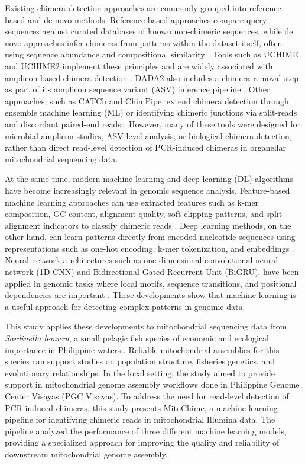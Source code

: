 Existing chimera detection approaches are commonly grouped into reference-based and de novo methods. Reference-based approaches compare query sequences against curated databases of known non-chimeric sequences, while de novo approaches infer chimeras from patterns within the dataset itself, often using sequence abundance and compositional similarity \citep{Edgar2011,Edgar2016}. Tools such as UCHIME and UCHIME2 implement these principles and are widely associated with amplicon-based chimera detection \citep{Edgar2011,Edgar2016}. DADA2 also includes a chimera removal step as part of its amplicon sequence variant (ASV) inference pipeline \citep{Callahan2016}. Other approaches, such as CATCh and ChimPipe, extend chimera detection through ensemble machine learning (ML) or identifying chimeric junctions via split-reads and discordant paired-end reads \citep{Mysara2015,Rodriguez2017}. However, many of these tools were designed for microbial amplicon studies, ASV-level analysis, or biological chimera detection, rather than direct read-level detection of PCR-induced chimeras in organellar mitochondrial sequencing data.

At the same time, modern machine learning and deep learning (DL) algorithms have become increasingly relevant in genomic sequence analysis. Feature-based machine learning approaches can use extracted features such as k-mer composition, GC content, alignment quality, soft-clipping patterns, and split-alignment indicators to classify chimeric reads \citep{Vervier2015,Li2018,Sedlazeck2018,Ren2020}. Deep learning methods, on the other hand, can learn patterns directly from encoded nucleotide sequences using representations such as one-hot encoding, k-mer tokenization, and embeddings \citep{He2021}. Neural network a  rchitectures such as one-dimensional convolutional neural network (1D CNN) and Bidirectional Gated Recurrent Unit (BiGRU), have been applied in genomic tasks where local motifs, sequence transitions, and positional dependencies are important \citep{Alipanahi2015,Shen2018,FernandezCastillo2022,Tabane2025}. These developments show that machine learning is a useful approach for detecting complex patterns in genomic data.

This study applies these developments to mitochondrial sequencing data from \textit{Sardinella lemuru}, a small pelagic fish species of economic and ecological importance in Philippine waters \citep{Willette2011,Labrador2021}. Reliable mitochondrial assemblies for this species can support studies on population structure, fisheries genetics, and evolutionary relationships. In the local setting, the study aimed to provide support in  mitochondrial genome assembly workflows done in Philippine Genome Center Visayas (PGC Visayas). To address the need for read-level detection of PCR-induced chimeras, this study presents MitoChime, a machine learning pipeline for identifying chimeric reads in mitochondrial Illumina data. The pipeline analyzed the performance of three different machine learning models, providing a specialized approach for improving the quality and reliability of downstream mitochondrial genome assembly.


